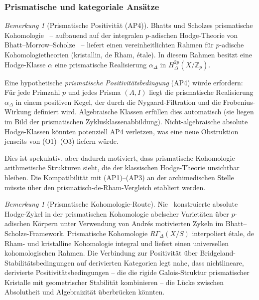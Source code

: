 \documentclass[aps,prd,twocolumn,superscriptaddress,nofootinbib]{revtex4-2}
\theoremstyle{definition}
\theoremstyle{remark}
\newtheorem{remark}[theorem]{Bemerkung}
\begin{document}
\subsubsection{Prismatische und kategoriale Ansätze}

\begin{remark}[Prismatische Positivität (AP4)]
\label{rem:prismatic}
Bhatts und Scholzes prismatische Kohomologie~\cite{BhattScholze2022} -- aufbauend auf der integralen $p$-adischen Hodge-Theorie von Bhatt--Morrow--Scholze~\cite{BhattMorrowScholze2018} -- liefert einen vereinheitlichten Rahmen für $p$-adische Kohomologietheorien (kristallin, de Rham, étale). In diesem Rahmen besitzt eine Hodge-Klasse $\alpha$ eine prismatische Realisierung $\alpha_{\Delta}$ in $H^{2p}_{\Delta}(X/\mathbb{Z}_p)$.

Eine hypothetische \textit{prismatische Positivitätsbedingung} (AP4) würde erfordern: Für jede Primzahl $p$ und jedes Prisma $(A, I)$ liegt die prismatische Realisierung $\alpha_{\Delta}$ in einem \glqq positiven Kegel\grqq{}, der durch die Nygaard-Filtration und die Frobenius-Wirkung definiert wird. Algebraische Klassen erfüllen dies automatisch (sie liegen im Bild der prismatischen Zyklusklassenabbildung). Nicht-algebraische absolute Hodge-Klassen könnten potenziell AP4 verletzen, was eine neue Obstruktion jenseits von (O1)--(O3) liefern würde.

Dies ist spekulativ, aber dadurch motiviert, dass prismatische Kohomologie arithmetische Strukturen \glqq sieht\grqq{}, die der klassischen Hodge-Theorie unsichtbar bleiben. Die Kompatibilität mit (AP1)--(AP3) an der archimedischen Stelle müsste über den prismatisch-de-Rham-Vergleich etabliert werden.
\end{remark}

\begin{remark}[Prismatische Kohomologie-Route]\label{rem:prismatic-route}
Nie~\cite{Nie2021} konstruierte absolute Hodge-Zykel in der prismatischen Kohomologie abelscher Varietäten über $p$-adischen Körpern unter Verwendung von Andrés motivierten Zykeln im Bhatt--Scholze-Framework. Prismatische Kohomologie $R\Gamma_\Delta(X/S)$ interpoliert étale, de Rham- und kristalline Kohomologie integral und liefert einen universellen kohomologischen Rahmen. Die Verbindung zur Positivität über Bridgeland-Stabilitätsbedingungen auf derivierten Kategorien legt nahe, dass nichtlineare, derivierte Positivitätsbedingungen -- die die rigide Galois-Struktur prismatischer Kristalle mit geometrischer Stabilität kombinieren -- die Lücke zwischen Absolutheit und Algebraizität überbrücken könnten.
\end{remark}
\end{document}
